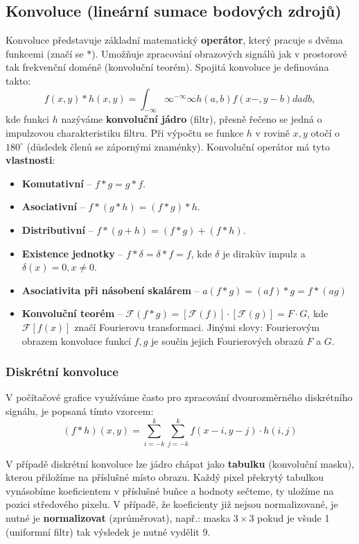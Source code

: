 \subsection{Konvoluce (lineární sumace bodových zdrojů)}
Konvoluce představuje základní matematický \textbf{operátor}, který pracuje s dvěma funkcemi (značí se $*$). Umožňuje zpracování obrazových signálů jak v prostorové tak frekvenční doméně (konvoluční teorém). Spojitá konvoluce je definována takto:
\begin{equation*}
f(x, y) * h(x, y) = \int_{-\infty}{\infty}^{-\infty}{\infty} h(a, b) f(x - , y - b)dadb,
\end{equation*}
kde funkci $h$ nazýváme \textbf{konvoluční jádro} (filtr), přesně řečeno se jedná o impulzovou charakteristiku filtru. Při výpočtu se funkce $h$ v rovině $x, y$ otočí o $180^\circ$ (důsledek členů se zápornými znaménky). Konvoluční operátor má tyto \textbf{vlastnosti}:
\begin{itemize}
\item \textbf{Komutativní} -- $f * g = g * f$.
\item \textbf{Asociativní} -- $f * (g * h) = (f * g) * h$.
\item \textbf{Distributivní} -- $f * (g + h) = (f * g) + (f * h)$.
\item \textbf{Existence jednotky} -- $f * \delta = \delta * f = f$, kde $\delta$ je dirakův impulz a $\delta(x) = 0, x \neq 0$.
\item \textbf{Asociativita při násobení skalárem} -- $a(f * g) = (af) * g = f * (ag)$
\item \textbf{Konvoluční teorém} -- $\mathcal{F}(f * g) = [\mathcal{F}(f)] \cdot [\mathcal{F}(g)] = F \cdot G$, kde $\mathcal{F}[f(x)]$ značí Fourierovu transformaci. Jinými slovy: Fourierovým obrazem konvoluce funkcí $f, g$ je součin jejich Fourierových obrazů $F$ a $G$.
\end{itemize}

\subsubsection{Diskrétní konvoluce}
V počítačové grafice využíváme často pro zpracování dvourozměrného diskrétního signálu, je popsaná tímto vzorcem:
\begin{equation*}
(f*h)(x,y)=\sum _{{i=-k}}^{k}\sum _{{j=-k}}^{k}f(x-i,y-j)\cdot h(i,j)
\end{equation*}

V případě diskrétní konvoluce lze jádro chápat jako \textbf{tabulku} (konvoluční masku), kterou přiložíme na příslušné místo obrazu. Každý pixel překrytý tabulkou vynásobíme koeficientem v příslušné buňce a hodnoty sečteme, ty uložíme na pozici středového pixelu. V případě, že koeficienty již nejsou normalizované, je nutné je \textbf{normalizovat} (zprůměrovat), např.: maska $3 \times 3$ pokud je všude 1 (uniformní filtr) tak výsledek je nutné vydělit $9$.

